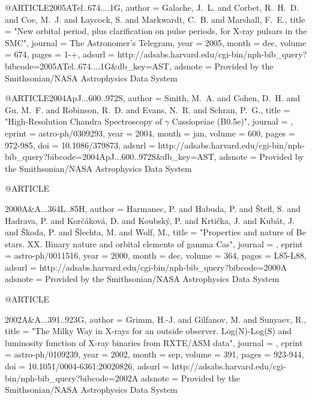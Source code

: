 {{{{{{{{@ARTICLE{2005ATel..674....1G,
   author = {{Galache}, J.~L. and {Corbet}, R.~H.~D. and {Coe}, M.~J. and 
	{Laycock}, S. and {Markwardt}, C.~B. and {Marshall}, F.~E.},
    title = "{New orbital period, plus clarification on pulse periods, for X-ray pulsars in the SMC}",
  journal = {The Astronomer's Telegram},
     year = 2005,
    month = dec,
   volume = 674,
    pages = {1-+},
   adsurl = {http://adsabs.harvard.edu/cgi-bin/nph-bib_query?bibcode=2005ATel..674....1G&db_key=AST},
  adsnote = {Provided by the Smithsonian/NASA Astrophysics Data System}
}



@ARTICLE{2004ApJ...600..972S,
   author = {{Smith}, M.~A. and {Cohen}, D.~H. and {Gu}, M.~F. and {Robinson}, R.~D. and 
	{Evans}, N.~R. and {Schran}, P.~G.},
    title = "{High-Resolution Chandra Spectroscopy of {$\gamma$} Cassiopeiae (B0.5e)}",
  journal = {\apj},
   eprint = {astro-ph/0309293},
     year = 2004,
    month = jan,
   volume = 600,
    pages = {972-985},
      doi = {10.1086/379873},
   adsurl = {http://adsabs.harvard.edu/cgi-bin/nph-bib_query?bibcode=2004ApJ...600..972S&db_key=AST},
  adsnote = {Provided by the Smithsonian/NASA Astrophysics Data System}
}



@ARTICLE{2000A&A...364L..85H,
   author = {{Harmanec}, P. and {Habuda}, P. and {{\v S}tefl}, S. and {Hadrava}, P. and 
	{Kor{\v c}{\'a}kov{\'a}}, D. and {Koubsk{\'y}}, P. and {Krti{\v c}ka}, J. and 
	{Kub{\'a}t}, J. and {{\v S}koda}, P. and {{\v S}lechta}, M. and 
	{Wolf}, M.},
    title = "{Properties and nature of Be stars. XX. Binary nature and orbital elements of gamma Cas}",
  journal = {\aap},
   eprint = {astro-ph/0011516},
     year = 2000,
    month = dec,
   volume = 364,
    pages = {L85-L88},
   adsurl = {http://adsabs.harvard.edu/cgi-bin/nph-bib_query?bibcode=2000A%
  adsnote = {Provided by the Smithsonian/NASA Astrophysics Data System}
}



@ARTICLE{2002A&A...391..923G,
   author = {{Grimm}, H.-J. and {Gilfanov}, M. and {Sunyaev}, R.},
    title = "{The Milky Way in X-rays for an outside observer. Log(N)-Log(S) and luminosity function of X-ray binaries from RXTE/ASM data}",
  journal = {\aap},
   eprint = {astro-ph/0109239},
     year = 2002,
    month = sep,
   volume = 391,
    pages = {923-944},
      doi = {10.1051/0004-6361:20020826},
   adsurl = {http://adsabs.harvard.edu/cgi-bin/nph-bib_query?bibcode=2002A%
  adsnote = {Provided by the Smithsonian/NASA Astrophysics Data System}
}



}}}}}}}}}}
